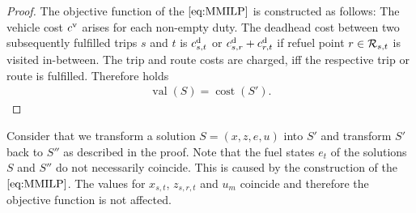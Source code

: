 \begin{proof}
The objective function of the $\eqref{eq:MMILP}$ is constructed as follows: The vehicle cost $c^{\operatorname{v}}$ arises for each non-empty duty. The deadhead cost between two subsequently fulfilled trips $s$ and $t$ is $c^{\operatorname{d}}_{s,t}$ or ${c^{\operatorname{d}}_{s,r}+c^{\operatorname{d}}_{r,t}}$ if refuel point ${r\in\mathcal{R}_{s,t}}$ is visited in-between. The trip and route costs are charged, iff the respective trip or route is fulfilled. Therefore holds
\begin{align*}
	\operatorname{val}(S) = \operatorname{cost}\left(S'\right).
\end{align*}
%
\end{proof}

\begin{remark}

Consider that we transform a solution ${S=(x,z,e,u)}$ into $S'$ and transform $S'$ back to $S''$ as described in the proof. Note that the fuel states $e_t$ of the solutions $S$ and $S''$ do not necessarily coincide. This is caused by the construction of the $\eqref{eq:MMILP}$. The values for $x_{s,t}$, $z_{s,r,t}$ and $u_m$ coincide and therefore the objective function is not affected.

\end{remark}